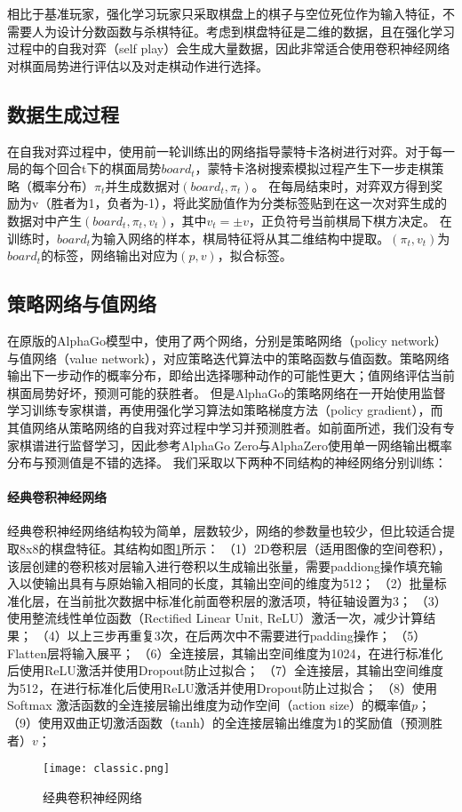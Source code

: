 相比于基准玩家，强化学习玩家只采取棋盘上的棋子与空位死位作为输入特征，不需要人为设计分数函数与杀棋特征。考虑到棋盘特征是二维的数据，且在强化学习过程中的自我对弈（self play）会生成大量数据，因此非常适合使用卷积神经网络对棋面局势进行评估以及对走棋动作进行选择\cite{Silver2016}。

\subsection{数据生成过程}
在自我对弈过程中，使用前一轮训练出的网络指导蒙特卡洛树进行对弈。对于每一局的每个回合t下的棋面局势$board_{t}$，蒙特卡洛树搜索模拟过程产生下一步走棋策略（概率分布）$\pi_{t}$并生成数据对$(board_{t},\pi_{t})$。
在每局结束时，对弈双方得到奖励为v（胜者为1，负者为-1），将此奖励值作为分类标签贴到在这一次对弈生成的数据对中产生$(board_{t},\pi_{t},v_{t})$，其中$v_{t}=\pm v$，正负符号当前棋局下棋方决定。
在训练时，$board_{t}$为输入网络的样本，棋局特征将从其二维结构中提取。$(\pi_{t},v_{t})$为$board_{t}$的标签，网络输出对应为$(p,v)$，拟合标签。
\subsection{策略网络与值网络}
在原版的AlphaGo模型\cite{Silver2016}中，使用了两个网络，分别是策略网络（policy network）与值网络（value network），对应策略迭代算法中的策略函数与值函数。策略网络输出下一步动作的概率分布，即给出选择哪种动作的可能性更大；值网络评估当前棋面局势好坏，预测可能的获胜者。
但是AlphaGo的策略网络在一开始使用监督学习训练专家棋谱，再使用强化学习算法如策略梯度方法（policy gradient\cite{silver2014deterministic}），而其值网络从策略网络的自我对弈过程中学习并预测胜者。如前面所述，我们没有专家棋谱进行监督学习，因此参考AlphaGo Zero与AlphaZero使用单一网络输出概率分布与预测值是不错的选择。
我们采取以下两种不同结构的神经网络分别训练：
\paragraph{经典卷积神经网络}
经典卷积神经网络结构较为简单，层数较少，网络的参数量也较少，但比较适合提取8x8的棋盘特征。其结构如图\ref{fig:cnn}所示：
（1）2D卷积层（适用图像的空间卷积），该层创建的卷积核对层输入进行卷积以生成输出张量，需要paddiong操作填充输入以使输出具有与原始输入相同的长度，其输出空间的维度为512；
（2）批量标准化层\cite{batchnorm}，在当前批次数据中标准化前面卷积层的激活项，特征轴设置为3；
（3）使用整流线性单位函数（Rectified Linear Unit, ReLU）\cite{xu2015empirical}激活一次，减少计算结果；
（4）以上三步再重复3次，在后两次中不需要进行padding操作；
（5）Flatten层将输入展平；
（6）全连接层，其输出空间维度为1024，在进行标准化后使用ReLU激活并使用Dropout\cite{srivastava2014dropout}防止过拟合；
（7）全连接层，其输出空间维度为512，在进行标准化后使用ReLU激活并使用Dropout防止过拟合；
（8）使用Softmax 激活函数的全连接层输出维度为动作空间（action size）的概率值$p$；
（9）使用双曲正切激活函数（tanh）的全连接层输出维度为1的奖励值（预测胜者）$v$；
\begin{figure}[H]
    \centering
    \texttt{[image: classic.png]}
    \caption[cnn]{%
    经典卷积神经网络%
      }
    \label{fig:cnn}
\end{figure}
